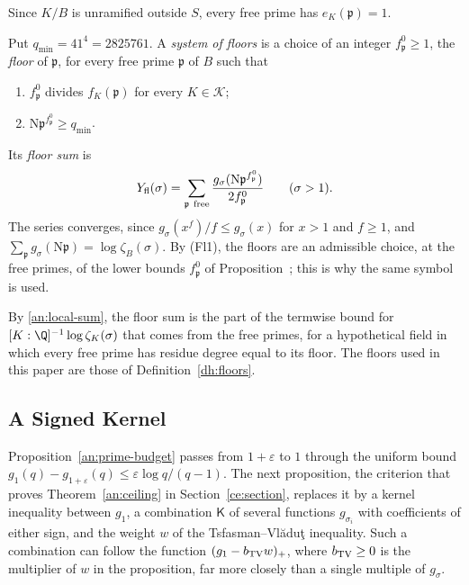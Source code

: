 Since $K/B$ is unramified outside $S$, every free prime has $e_K(\mathfrak
p)=1$.

\begin{definition}\label{an:floor-def}
Put $q_{\min}=41^4=2825761$. A \emph{system of floors} is a choice of an
integer $f^0_{\mathfrak p}\ge1$, the \emph{floor} of $\mathfrak p$, for every
free prime $\mathfrak p$ of $B$ such that
\begin{enumerate}
\item[(Fl1)] $f^0_{\mathfrak p}$ divides $f_K(\mathfrak p)$ for every
 $K\in\mathcal K$;
\item[(Fl2)] $\mathrm N\mathfrak p^{f^0_{\mathfrak p}}\ge q_{\min}$.
\end{enumerate}
Its \emph{floor sum} is
\[
 Y_{\rm fl}(\sigma)=\sum_{\mathfrak p\ \rm free}
 \frac{g_\sigma(\mathrm N\mathfrak p^{f^0_{\mathfrak p}})}{2f^0_{\mathfrak p}}
 \qquad(\sigma>1).
\]
The series converges, since $g_\sigma(x^f)/f\le g_\sigma(x)$ for $x>1$ and
$f\ge1$, and $\sum_{\mathfrak p}g_\sigma(\mathrm N\mathfrak p)=\log\zeta_B(\sigma)$.
By (Fl1), the floors are an admissible choice, at the free primes, of the lower
bounds $f^0_{\mathfrak p}$ of Proposition~; this is why
the same symbol is used.
\end{definition}

By \eqref{an:local-sum}, the floor sum is the part of the termwise bound
for $[K:\Q]^{-1}\log\zeta_K(\sigma)$ that comes from the free primes, for a
hypothetical field in which every free prime has residue degree equal to
its floor. The floors used in this paper are those of
Definition~\ref{dh:floors}.

\subsection{A Signed Kernel}\label{an:signed-section}
Proposition~\ref{an:prime-budget} passes from $1+\varepsilon$ to $1$ through
the uniform bound $g_1(q)-g_{1+\varepsilon}(q)\le\varepsilon\log q/(q-1)$.
The next proposition, the criterion that proves Theorem~\ref{an:ceiling} in
Section~\ref{ce:section}, replaces it by a kernel inequality between $g_1$,
a combination $\mathsf K$ of several functions $g_{\sigma_i}$ with
coefficients of either sign, and the weight $w$ of the
Tsfasman--Vl\u{a}du\c{t} inequality. Such a combination can follow the
function $(g_1-b_{\rm TV}w)_+$, where $b_{\rm TV}\ge0$ is the multiplier of
$w$ in the proposition, far more closely than a single multiple of
$g_\sigma$.

